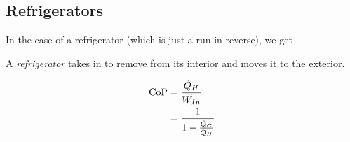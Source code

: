 \subsection{Refrigerators}\label{subsec:Refrigerators}
In the case of a refrigerator (which is just a  run in reverse), we get .

\begin{definition}[Refrigerator]\label{def:Refrigerator}
  A \emph{refrigerator} takes  in to remove  from its interior and moves it to the exterior.
\end{definition}

\begin{equation}\label{eq:Coefficient_of_Performance-Refrigerator}
  \begin{aligned}
    \text{CoP} &= \frac{\dot{Q}_{H}}{\dot{W_{In}}} \\
    &= \frac{1}{1 - \frac{\dot{Q}_{C}}{\dot{Q}_{H}}}
  \end{aligned}
\end{equation}

